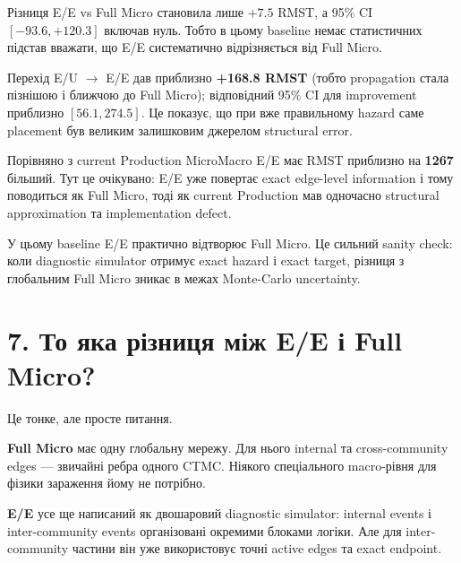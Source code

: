 \documentclass[11pt,a4paper]{article}
\begin{document}
Різниця E/E vs Full Micro становила лише $+7.5$ RMST, а 95\% CI $[-93.6,+120.3]$ включав нуль. Тобто в цьому baseline немає статистичних підстав вважати, що E/E систематично відрізняється від Full Micro.

Перехід E/U $\to$ E/E дав приблизно \textbf{+168.8 RMST} (тобто propagation стала пізнішою і ближчою до Full Micro); відповідний 95\% CI для improvement приблизно $[56.1,274.5]$. Це показує, що при вже правильному hazard саме placement був великим залишковим джерелом structural error.

Порівняно з current Production MicroMacro E/E має RMST приблизно на \textbf{1267} більший. Тут це очікувано: E/E уже повертає exact edge-level information і тому поводиться як Full Micro, тоді як current Production мав одночасно structural approximation та implementation defect.

\begin{tcolorbox}[colback=soft,colframe=exact,title=Головний результат E/E]
У цьому baseline E/E практично відтворює Full Micro. Це сильний sanity check: коли diagnostic simulator отримує exact hazard і exact target, різниця з глобальним Full Micro зникає в межах Monte-Carlo uncertainty.
\end{tcolorbox}

\section*{7. То яка різниця між E/E і Full Micro?}

Це тонке, але просте питання.

\textbf{Full Micro} має одну глобальну мережу. Для нього internal та cross-community edges --- звичайні ребра одного CTMC. Ніякого спеціального macro-рівня для фізики зараження йому не потрібно.

\textbf{E/E} усе ще написаний як двошаровий diagnostic simulator: internal events і inter-community events організовані окремими блоками логіки. Але для inter-community частини він уже використовує точні active edges та exact endpoint.
\end{document}
